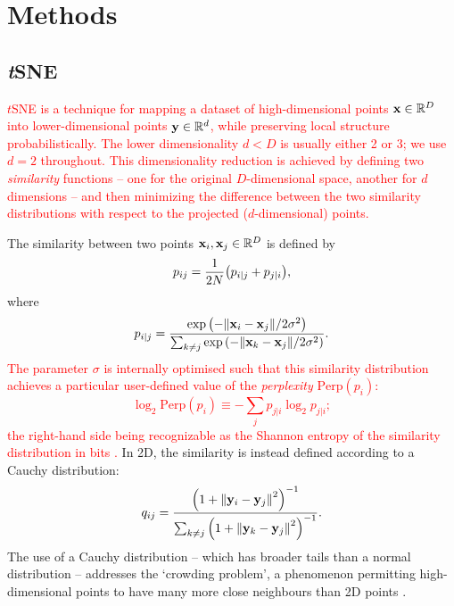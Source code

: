 \documentclass[fleqn,usenatbib]{rasti}
\newcommand\xb{\vb{x}}
\newcommand\yb{\vb{y}}
\newcommand{\red}[1]{\textcolor{red}{#1}}
\begin{document}
\section{Methods} \label{sec:methods}

\subsection{\textit{t}SNE} \label{sec:tsne}


\red{
$t$SNE is a technique for mapping a dataset of high-dimensional points $\xb\in\mathbb{R}^D$ into lower-dimensional points $\yb\in\mathbb{R}^d$, while preserving local structure probabilistically.
The lower dimensionality $d<D$ is usually either 2 or 3; we use $d=2$ throughout.
This dimensionality reduction is achieved by defining two \textit{similarity} functions -- one for the original $D$-dimensional space, another for $d$ dimensions -- and then minimizing the difference between the two similarity distributions with respect to the projected ($d$-dimensional) points.
}

The similarity between two points $\xb_i, \xb_j \in \mathbb{R}^D$ is defined by
\begin{equation}
p_{ij} = \frac{1}{2N} \qty(p_{i|j} + p_{j|i}),
\end{equation}
where
\begin{equation}
p_{i|j} = \frac{
    \exp\qty(-\norm{\xb_i - \xb_j} / 2\sigma^2)
}{
    \sum_{k\neq j} \exp\qty(-\norm{\xb_k - \xb_j} / 2 \sigma^2)
}.
\end{equation}
\red{
The parameter $\sigma$ is internally optimised such that this similarity distribution achieves a particular user-defined value of the \textit{perplexity} $\mathrm{Perp}(p_i)$:
\begin{equation}
\log_2\mathrm{Perp}(p_i) \equiv
    -\sum_j p_{j|i} \log_2 p_{j|i};
\end{equation}
the right-hand side being recognizable as the Shannon entropy of the similarity distribution in bits \citep{vandermaaten08}.
}
In 2D, the similarity is instead defined according to a Cauchy distribution:
\begin{equation}
q_{ij} = \frac{
    \qty(1 + \norm{\yb_i - \yb_j}^2)^{-1}
}{
    \sum_{k\neq j} \qty(1 + \norm{\yb_k - \yb_j}^2)^{-1}
}.
\end{equation}
The use of a Cauchy distribution -- which has broader tails than a normal distribution -- addresses the `crowding problem', a phenomenon permitting high-dimensional points to have many more close neighbours than 2D points \citep{vandermaaten08}.
\end{document}
